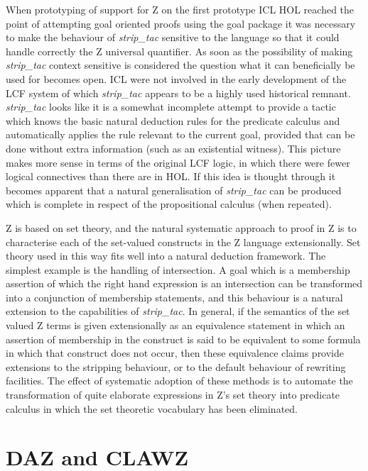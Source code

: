 \documentclass[10pt,titlepage]{book}
\begin{document}
When prototyping of support for Z on the first prototype ICL HOL reached the point of attempting goal oriented proofs using the goal package it was necessary to make the behaviour of {\it strip\_tac} sensitive to the language so that it could handle correctly the Z universal quantifier.
As soon as the possibility of making {\it strip\_tac} context sensitive is considered the question what it can beneficially be used for becomes open.
ICL were not involved in the early development of the LCF system of which {\it strip\_tac} appears to be a highly used historical remnant.
{\it strip\_tac} looks like it is a somewhat incomplete attempt to provide a tactic which knows the basic natural deduction rules for the predicate calculus and automatically applies the rule relevant to the current goal, provided that can be done without extra information (such as an existential witness).
This picture makes more sense in terms of the original LCF logic, in which there were fewer logical connectives than there are in HOL.
If this idea is thought through it becomes apparent that a natural generalisation of {\it strip\_tac} can be produced which is complete in respect of the propositional calculus (when repeated).

Z is based on set theory, and the natural systematic approach to proof in Z is to characterise each of the set-valued constructs in the Z language extensionally.
Set theory used in this way fits well into a natural deduction framework.
The simplest example is the handling of intersection.
A goal which is a membership assertion of which the right hand expression is an intersection can be transformed into a conjunction of membership statements, and this behaviour is a natural extension to the capabilities of {\it strip\_tac}.
In general, if the semantics of the set valued Z terms is given extensionally as an equivalence statement in which an assertion of membership in the construct is said to be equivalent to some formula in which that construct does not occur, then these equivalence claims provide extensions to the stripping behaviour, or to the default behaviour of rewriting facilities.
The effect of systematic adoption of these methods is to automate the transformation of quite elaborate expressions in Z's set theory into predicate calculus in which the set theoretic vocabulary has been eliminated.

\section{DAZ and CLAWZ}
\end{document}

